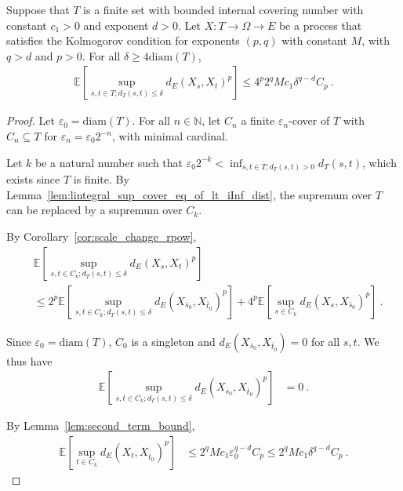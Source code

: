 \begin{theorem}\label{thm:finite_set_bound_of_dist_le_of_diam_le}
  \leanok
Suppose that $T$ is a finite set with bounded internal covering number with constant $c_1>0$ and exponent $d > 0$.
Let $X : T \to \Omega \to E$ be a process that satisfies the Kolmogorov condition for exponents $(p,q)$ with constant $M$, with $q > d$ and $p > 0$.
For all $\delta \ge 4\mathrm{diam}(T)$,
\begin{align*}
  \mathbb{E}\left[ \sup_{s, t \in T; d_T(s, t) \le \delta} d_E(X_s, X_t)^p \right]
  \le 4^p 2^q M c_1 \delta^{q - d} C_p
  \: .
\end{align*}
\end{theorem}

\begin{proof}\leanok
Let $\varepsilon_0 = \mathrm{diam}(T)$.
For all $n \in \mathbb{N}$, let $C_n$ a finite $\varepsilon_n$-cover of $T$ with $C_n \subseteq T$ for $\varepsilon_n = \varepsilon_0 2^{-n}$, with minimal cardinal.

Let $k$ be a natural number such that $\varepsilon_0 2^{-k} < \inf_{s, t \in T; d_T(s,t)>0} d_T(s, t)$, which exists since $T$ is finite.
By Lemma~\ref{lem:lintegral_sup_cover_eq_of_lt_iInf_dist}, the supremum over $T$ can be replaced by a supremum over $C_k$.

By Corollary~\ref{cor:scale_change_rpow},
\begin{align*}
  &\mathbb{E}\left[ \sup_{s, t \in C_k; d_T(s, t) \le \delta} d_E(X_s, X_t)^p \right]
  \\
  &\le 2^p \mathbb{E}\left[ \sup_{s, t \in C_k; d_T(s, t) \le \delta} d_E(X_{\bar{s}_0}, X_{\bar{t}_0})^p \right]
    + 4^p \mathbb{E}\left[ \sup_{s \in C_k} d_E(X_s, X_{\bar{s}_0})^p \right]
  \: .
\end{align*}

Since $\varepsilon_0 = \mathrm{diam}(T)$, $C_0$ is a singleton and $d_E(X_{\bar{s}_0}, X_{\bar{t}_0}) = 0$ for all $s, t$.
We thus have
\begin{align*}
  \mathbb{E} \left[ \sup_{s, t \in C_k; d_T(s, t) \le \delta} d_E(X_{\bar{s}_0}, X_{\bar{t}_0})^p \right]
  &= 0
  \: .
\end{align*}

By Lemma~\ref{lem:second_term_bound},
\begin{align*}
  \mathbb{E} \left[\sup_{t \in C_k} d_E(X_t, X_{\bar{t}_0})^p \right]
  &\le 2^q M c_1 \varepsilon_0^{q - d} C_p
  \le 2^q M c_1 \delta^{q - d} C_p
  \: .
\end{align*}
\end{proof}


